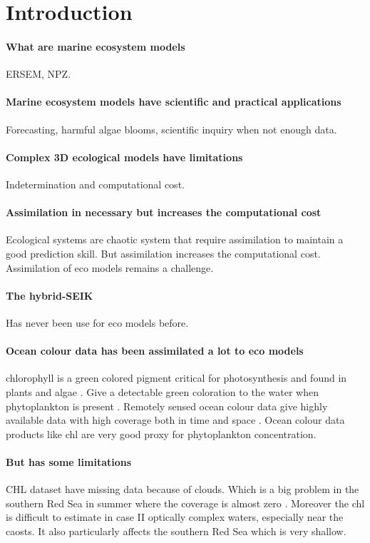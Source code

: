 \section{Introduction}

\paragraph{What are marine ecosystem models}
ERSEM, NPZ.

\paragraph{Marine ecosystem models have scientific and practical applications}
Forecasting, harmful algae blooms, scientific inquiry when not enough data.

\paragraph{Complex 3D ecological models have limitations}
Indetermination and computational cost.

\paragraph{Assimilation in necessary but increases the computational cost}
Ecological systems are chaotic system that require assimilation to
maintain a good prediction skill. But assimilation increases the computational
cost. Assimilation of eco models remains a challenge.

\paragraph{The hybrid-SEIK}
Has never been use for eco models before.

\paragraph{Ocean colour data has been assimilated a lot to eco models}
chlorophyll is a green colored pigment critical for photosynthesis and found
in plants and algae \citep{Pal2014}. Give a detectable green coloration
to the water when phytoplankton is present \citep{Robinson2010}.
Remotely sensed ocean colour data give highly available data with 
high coverage both in time and space \citep{Robinson2010}. Ocean colour
data products like chl are very good proxy for phytoplankton concentration.

\paragraph{But has some limitations}
CHL dataset have missing data because of clouds. Which is a big problem in 
the southern Red Sea in summer where the coverage is almost zero
\cite{Racault}. Moreover the chl is difficult to estimate in case II
optically complex waters, especially near the caosts. It also particularly
affects the southern Red Sea which is very shallow.

